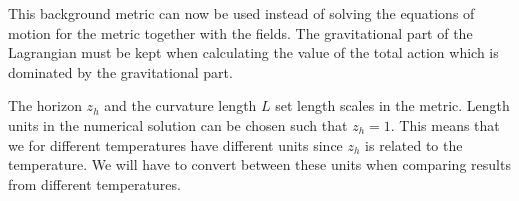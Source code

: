 \documentclass[12pt]{report}
\renewcommand{\d}{\ensuremath{\mathrm{d}}}
\begin{document}
This background metric can now be used instead of solving the equations of motion for the metric together with the fields. The gravitational part of the Lagrangian must be kept when calculating the value of the total action which is dominated by the gravitational part.

The horizon $z_h$ and the curvature length $L$ set length scales in the metric. Length units in the numerical solution can be chosen such that $z_h=1$. This means that we for different temperatures have different units since $z_h$ is related to the temperature. We will have to convert between these units when comparing results from different temperatures.\\
\end{document}
